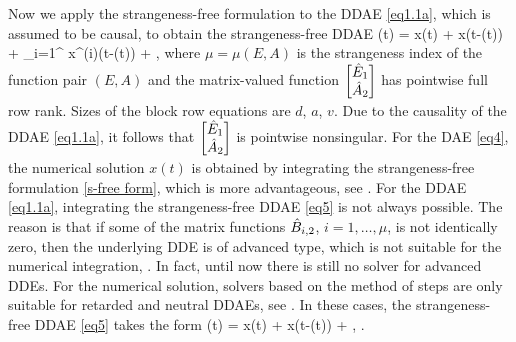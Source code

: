 \documentclass[final,reqno]{siamltex}
\begin{document}
Now we apply the strangeness-free formulation to the DDAE \eqref{eq1.1a}, which is assumed to be causal, to obtain the strangeness-free DDAE
%
\be\label{eq5}
  (t) \!=\!  x(t) \!+\!
  x(t-\vtau(t))
 \!+\!  \sum_{i=1}^{\mu}  x^{(i)}(t-\vtau(t))
 \!+\! , \quad {}
\ee
%
where $\mu=\mu(E,A)$ is the strangeness index of the function pair $(E,A)$ and the matrix-valued function $\begin{bmatrix} \hat{E}_1 \\ \hat{A}_2 \end{bmatrix}$ has pointwise full row rank.
Sizes of the block row equations are $d$, $a$, $v$. Due to the causality of the DDAE \eqref{eq1.1a}, it follows that $\begin{bmatrix} \hat{E}_1 \\ \hat{A}_2 \end{bmatrix}$ is pointwise 
nonsingular.
For the DAE \eqref{eq4}, the numerical solution $x(t)$ is obtained by integrating the strangeness-free formulation \eqref{s-free form}, which is more 
advantageous, see \cite{KunM96a,KunM96c,KunM06}.
For the DDAE \eqref{eq1.1a}, integrating the strangeness-free DDAE \eqref{eq5} is not always possible. The reason is that if 
some of the matrix functions $\hat{B}_{i,2}$, $i=1,\dots,\mu$, is not identically zero, then the underlying DDE 
is of advanced type, which is not suitable for the numerical integration, \cite{BelZ03}. In fact, until now there is still no solver for advanced DDEs. 
For the numerical solution, solvers based on the method of steps are only suitable for retarded and neutral DDAEs, see \cite{AscP95,GugH07,Hau97,HaM14}.
In these cases, the strangeness-free DDAE \eqref{eq5} takes the form
%
\be\label{eq6}
  (t) \!=\!  x(t) \!+\!
  x(t-\vtau(t)) \!+\! , \quad {}.
\end{document}
